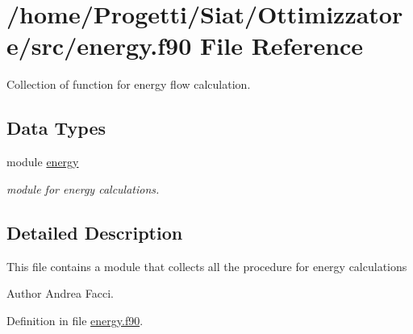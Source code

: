 \hypertarget{energy_8f90}{\section{/home/\-Progetti/\-Siat/\-Ottimizzatore/src/energy.f90 File Reference}
\label{energy_8f90}
}


Collection of function for energy flow calculation.  


\subsection*{Data Types}
\begin{DoxyCompactItemize}
\item 
module \hyperlink{classenergy}{energy}
\begin{DoxyCompactList}\small\item\em module for energy calculations. \end{DoxyCompactList}\end{DoxyCompactItemize}


\subsection{Detailed Description}
This file contains a module that collects all the procedure for energy calculations \begin{DoxyAuthor}{Author}
Andrea Facci. 
\end{DoxyAuthor}


Definition in file \hyperlink{energy_8f90_source}{energy.\-f90}.

